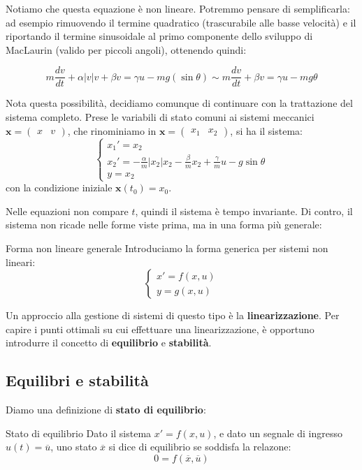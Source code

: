 \documentclass[a4paper,11pt]{article}
\begin{document}
Notiamo che questa equazione è non lineare.
Potremmo pensare di semplificarla: ad esempio rimuovendo il termine quadratico (trascurabile alle basse velocità) e il riportando il termine sinusoidale al primo componente dello sviluppo di MacLaurin (valido per piccoli angoli), ottenendo quindi:

$$
m \frac{dv}{dt} + \alpha |v|v + \beta v = \gamma u - m g (\sin{\theta}) \sim m \frac{dv}{dt} + \beta v = \gamma u - mg\theta
$$

Nota questa possibilità, decidiamo comunque di continuare con la trattazione del sistema completo.
Prese le variabili di stato comuni ai sistemi meccanici $\mathbf{x} = \begin{pmatrix}x & v \end{pmatrix}$, che rinominiamo in $\mathbf{x} = \begin{pmatrix} x_1 & x_2 \end{pmatrix}$, si ha il sistema:
\[
	\begin{cases}
		x_1' = x_2 \\
		x_2' = -\frac{\alpha}{m} |x_2| x_2 - \frac{\beta}{m} x_2 + \frac{\gamma}{m} u - g \sin{\theta} \\ 
		y = x_2
	\end{cases}
\]
con la condizione iniziale $\mathbf{x}(t_0) = x_0$.

Nelle equazioni non compare $t$, quindi il sistema è tempo invariante. 
Di contro, il sistema non ricade nelle forme viste prima, ma in una forma più generale:
\begin{definition}{Forma non lineare generale}
Introduciamo la forma generica per sistemi non lineari:
\[
	\begin{cases}
		x' = f(x, u) \\
		y = g(x, u)
	\end{cases}
\]
\end{definition}

Un approccio alla gestione di sistemi di questo tipo è la \textbf{linearizzazione}.
Per capire i punti ottimali su cui effettuare una linearizzazione, è opportuno introdurre il concetto di \textbf{equilibrio} e \textbf{stabilità}.

\subsection{Equilibri e stabilità}
Diamo una definizione di \textbf{stato di equilibrio}:
\begin{definition}{Stato di equilibrio}
	Dato il sistema $x' = f(x, u)$, e dato un segnale di ingresso $u(t) = \overline{u}$, uno stato $\overline{x}$ si dice di equilibrio se soddisfa la relazone:
	$$
	0 = f(\overline{x}, \overline{u})
	$$
\end{definition}
\end{document}
